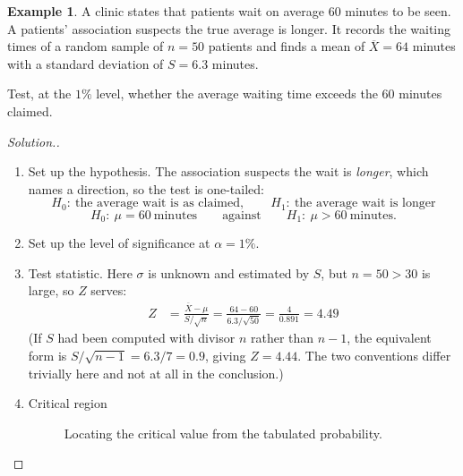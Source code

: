 \documentclass[11pt,a4paper]{article}
\theoremstyle{definition}
\newtheorem{example}[thm]{Example}
\newenvironment{solution}
  {\renewcommand{\qedsymbol}{}\begin{proof}[\textit{Solution}.]}
  {\end{proof}}
\begin{document}
\begin{example}
A clinic states that patients wait on average $60$ minutes to be seen. A patients' association
suspects the true average is longer. It records the waiting times of a random sample of
$n=50$ patients and finds a mean of $\overline{X}=64$ minutes with a standard deviation of
$S=6.3$ minutes.

Test, at the $1\%$ level, whether the average waiting time exceeds the $60$ minutes claimed.
\end{example}

\begin{solution}
\begin{enumerate}
\item Set up the hypothesis. The association suspects the wait is \emph{longer}, which names
a direction, so the test is one-tailed:
\[H_0:\ \text{the average wait is as claimed},\qquad H_1:\ \text{the average wait is longer}\]
\[H_0:\ \mu=60\ \text{minutes}\qquad\text{against}\qquad H_1:\ \mu>60\ \text{minutes}.\]
\item Set up the level of significance at $\alpha=1\%$.
\item Test statistic. Here $\sigma$ is unknown and estimated by $S$, but $n=50>30$ is large,
so $Z$ serves:
\begin{align*}
Z &=\frac{\overline{X}-\mu}{S/\sqrt{n}}=\frac{64-60}{6.3/\sqrt{50}}=\frac{4}{0.891}=4.49
\end{align*}
(If $S$ had been computed with divisor $n$ rather than $n-1$, the equivalent form is
$S/\sqrt{n-1}=6.3/7=0.9$, giving $Z=4.44$. The two conventions differ trivially here and not
at all in the conclusion.)
\item Critical region




\begin{figure}[H]
\centering
{}
\caption{Locating the critical value from the tabulated probability.}
\end{figure}












\end{enumerate}
\end{solution}
\end{document}
